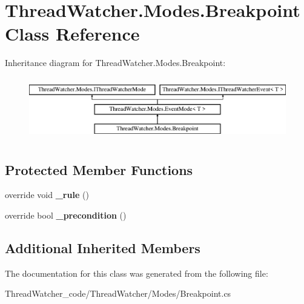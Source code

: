 \hypertarget{class_thread_watcher_1_1_modes_1_1_breakpoint}{\section{Thread\+Watcher.\+Modes.\+Breakpoint Class Reference}
\label{class_thread_watcher_1_1_modes_1_1_breakpoint}
}
Inheritance diagram for Thread\+Watcher.\+Modes.\+Breakpoint\+:\begin{figure}[H]
\begin{center}
\leavevmode
\includegraphics[height=2.745098cm]{class_thread_watcher_1_1_modes_1_1_breakpoint}
\end{center}
\end{figure}
\subsection*{Protected Member Functions}
\begin{DoxyCompactItemize}
\item 
\hypertarget{class_thread_watcher_1_1_modes_1_1_breakpoint_a357b89797574a462e0975bf1c20c5cc2}{override void {\bfseries \+\_\+rule} ()}\label{class_thread_watcher_1_1_modes_1_1_breakpoint_a357b89797574a462e0975bf1c20c5cc2}

\item 
\hypertarget{class_thread_watcher_1_1_modes_1_1_breakpoint_ab580682fa618e06727a4f430b8665e9f}{override bool {\bfseries \+\_\+precondition} ()}\label{class_thread_watcher_1_1_modes_1_1_breakpoint_ab580682fa618e06727a4f430b8665e9f}

\end{DoxyCompactItemize}
\subsection*{Additional Inherited Members}


The documentation for this class was generated from the following file\+:\begin{DoxyCompactItemize}
\item 
Thread\+Watcher\+\_\+code/\+Thread\+Watcher/\+Modes/Breakpoint.\+cs\end{DoxyCompactItemize}
